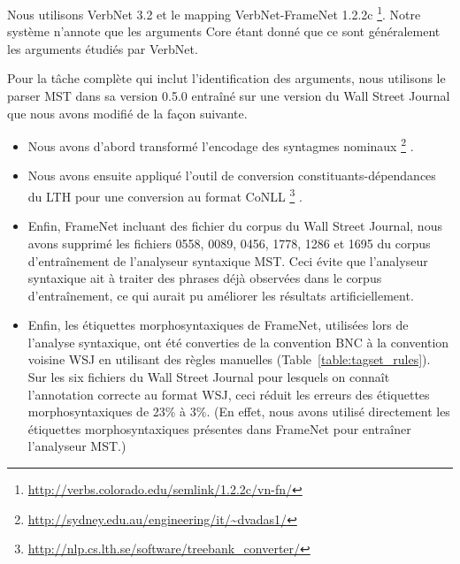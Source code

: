 Nous utilisons VerbNet 3.2 et le mapping VerbNet-FrameNet 1.2.2c
\footnote{\url{http://verbs.colorado.edu/semlink/1.2.2c/vn-fn/}}. Notre système
n'annote que les arguments Core étant donné que ce sont généralement les
arguments étudiés par VerbNet.

Pour la tâche complète qui inclut l'identification des arguments, nous
utilisons le parser MST dans sa version 0.5.0 \citep{mcdonald2006multilingual}
entraîné sur une version du Wall Street Journal que nous avons modifié de la
façon suivante.

\begin{itemize}
    \item Nous avons d'abord transformé l'encodage des syntagmes nominaux
        \footnote{\url{http://sydney.edu.au/engineering/it/~dvadas1/}}
        \citep{vadas2007adding}.
    \item Nous avons ensuite appliqué l'outil de conversion
        constituants-dépendances du LTH pour une conversion au format CoNLL
        \footnote{\url{http://nlp.cs.lth.se/software/treebank_converter/}}
        \citep{johansson2007extended}.
    \item Enfin, FrameNet incluant des fichier du corpus du Wall Street
        Journal, nous avons supprimé les fichiers 0558, 0089, 0456, 1778, 1286
        et 1695 du corpus d'entraînement de l'analyseur syntaxique MST. Ceci
        évite que l'analyseur syntaxique ait à traiter des phrases déjà
        observées dans le corpus d'entraînement, ce qui aurait pu améliorer les
        résultats artificiellement.
    \item Enfin, les étiquettes morphosyntaxiques de FrameNet, utilisées lors
        de l'analyse syntaxique, ont été converties de la convention BNC à la
        convention voisine WSJ en utilisant des règles manuelles
        (Table~\ref{table:tagset_rules}). Sur les six fichiers du Wall Street
        Journal pour lesquels on connaît l'annotation correcte au format WSJ,
        ceci réduit les erreurs des étiquettes morphosyntaxiques de 23\% à 3\%.
        (En effet, nous avons utilisé directement les étiquettes
        morphosyntaxiques présentes dans FrameNet pour entraîner l'analyseur
        MST.)
\end{itemize}

